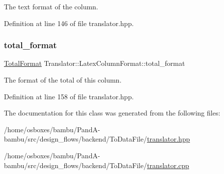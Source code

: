 The text format of the column. 



Definition at line 146 of file translator.\+hpp.

\mbox{\label{classTranslator_1_1LatexColumnFormat_a2bc467e238e3ca6a5a14337c464a9069}} 
\subsubsection{\texorpdfstring{total\+\_\+format}{total\_format}}
{\footnotesize\ttfamily \hyperlink{classTranslator_1_1LatexColumnFormat_a0754fb96fce28c9f04a8ef5353eede60}{Total\+Format} Translator\+::\+Latex\+Column\+Format\+::total\+\_\+format}



The format of the total of this column. 



Definition at line 158 of file translator.\+hpp.



The documentation for this class was generated from the following files\+:\begin{DoxyCompactItemize}
\item 
/home/osboxes/bambu/\+Pand\+A-\/bambu/src/design\+\_\+flows/backend/\+To\+Data\+File/\hyperlink{translator_8hpp}{translator.\+hpp}\item 
/home/osboxes/bambu/\+Pand\+A-\/bambu/src/design\+\_\+flows/backend/\+To\+Data\+File/\hyperlink{translator_8cpp}{translator.\+cpp}\end{DoxyCompactItemize}
